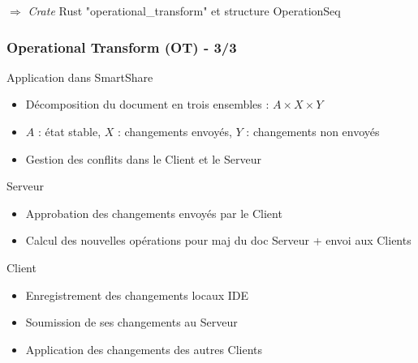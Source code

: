 \documentclass{beamer}
\begin{document}
\begin{frame}
    $\Rightarrow$ \textit{Crate} Rust "operational\_transform" et structure OperationSeq

\end{frame}

\begin{frame}
    \frametitle{Operational Transform (OT) - 3/3}
    \begin{block}{Application dans SmartShare}
        \begin{itemize}
            \item Décomposition du document en trois ensembles : $A \times X \times Y$
            \item $A$ : état stable, $X$ : changements envoyés, $Y$ : changements non envoyés
            \item Gestion des conflits dans le Client et le Serveur
        \end{itemize}
    \end{block}

    \begin{block}{Serveur}
        \begin{itemize}
            \item Approbation des changements envoyés par le Client
            \item Calcul des nouvelles opérations pour maj du doc Serveur + envoi aux Clients
        \end{itemize}
    \end{block}

    \begin{block}{Client}
        \begin{itemize}
            \item Enregistrement des changements locaux IDE
            \item Soumission de ses changements au Serveur
            \item Application des changements des autres Clients
        \end{itemize}
    \end{block}
\end{frame}
\end{document}
